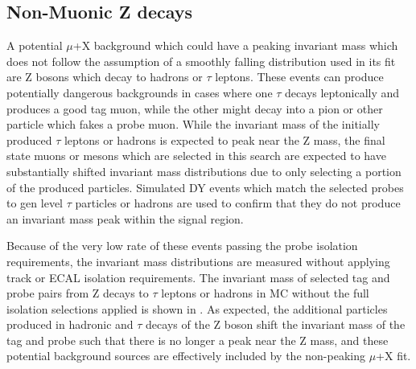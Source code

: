 \subsection{Non-Muonic Z decays}
A potential $\mu$+X background which could have a peaking invariant mass which does not follow the assumption of a smoothly falling distribution used in its fit are Z bosons which decay to hadrons or $\tau$ leptons.
These events can produce potentially dangerous backgrounds in cases where one $\tau$ decays leptonically and produces a good tag muon, while the other might decay into a pion or other particle which fakes a probe muon. 
While the invariant mass of the initially produced $\tau$ leptons or hadrons is expected to peak near the Z mass, the final state muons or mesons which are selected in this search are expected to have substantially shifted invariant mass distributions due to only selecting a portion of the produced particles.
Simulated DY events which match the selected probes to gen level $\tau$ particles or hadrons are used to confirm that they do not produce an invariant mass peak within the signal region.

Because of the very low rate of these events passing the probe isolation requirements, the invariant mass distributions are measured without applying track or ECAL isolation requirements.
The invariant mass of selected tag and probe pairs from Z decays to $\tau$ leptons or hadrons in MC without the full isolation selections applied is shown in .
As expected, the additional particles produced in hadronic and $\tau$ decays of the Z boson shift the invariant mass of the tag and probe such that there is no longer a peak near the Z mass, and these potential background sources are effectively included by the non-peaking $\mu$+X fit.

